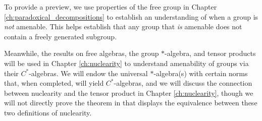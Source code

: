 To provide a preview, we use properties of the free group in Chapter \ref{ch:paradoxical_decompositions} to establish an understanding of when a group is \textit{not} amenable. This helps establish that any group that \textsl{is} amenable does not contain a freely generated subgroup.\newline

Meanwhile, the results on free algebras, the group $\ast$-algebra, and tensor products will be used in Chapter \ref{ch:nuclearity} to understand amenability of groups via their $C^{\ast}$-algebras. We will endow the universal $\ast$-algebra(s) with certain norms that, when completed, will yield $C^{\ast}$-algebras, and we will discuss the connection between nuclearity and the tensor product in Chapter \ref{ch:nuclearity}, though we will not directly prove the theorem in \cite{choi_nuclearity} that displays the equivalence between these two definitions of nuclearity.
